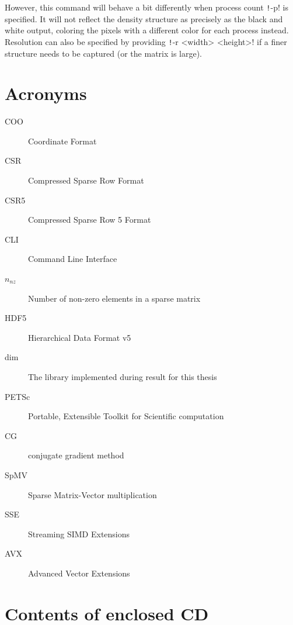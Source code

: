 \documentclass[thesis=M,english]{FITthesis}[2019/12/23]
\newcommand{\csre}[1]{\texttt!#1!}
\begin{document}
However, this command will behave a bit differently when process count \csre{-p} is specified. It will not
reflect the density structure as precisely as the black and white output, coloring the pixels
with a different color for each process instead. Resolution can also be specified by providing 
\csre{-r <width> <height>} if a finer structure needs to be captured (or the matrix is large).



\chapter{Acronyms}
\begin{description}
    \item[COO] Coordinate Format
    \item[CSR] Compressed Sparse Row Format
    \item[CSR5] Compressed Sparse Row 5 Format
    \item[CLI] Command Line Interface
    \item[$n_{nz}$] Number of non-zero elements in a sparse matrix
    \item[HDF5] Hierarchical Data Format v5
    \item[dim]  The library implemented during result for this thesis
    \item[PETSc] Portable, Extensible Toolkit for Scientific computation
    \item[CG] conjugate gradient method
    \item[SpMV] Sparse Matrix-Vector multiplication
    \item[SSE] Streaming SIMD Extensions
    \item[AVX] Advanced Vector Extensions
\end{description}


\chapter{Contents of enclosed CD}

\end{document}
